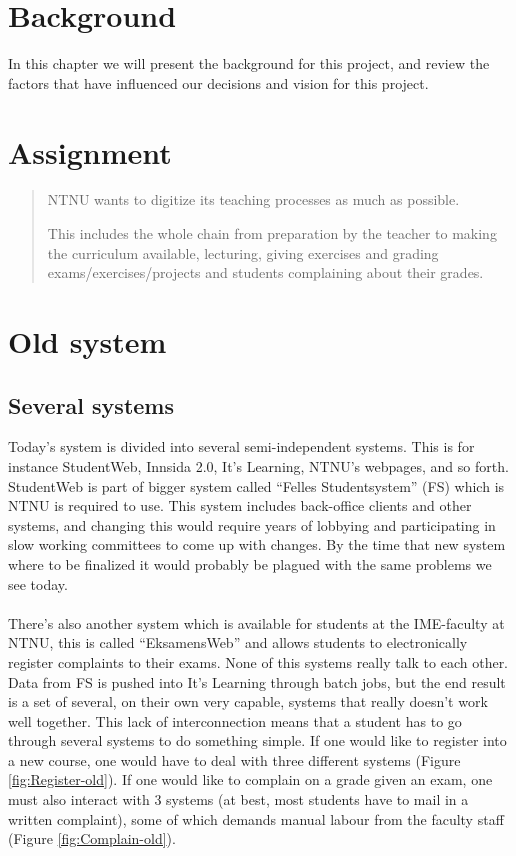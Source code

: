 \section{Background}
In this chapter we will present the background for this project, and review the factors that have
influenced our decisions and vision for this project.

\section{Assignment}

\begin{quote}
   NTNU wants to digitize its teaching processes as much as possible.\newline

   This includes the whole chain from preparation by the teacher to making the curriculum available, lecturing, giving exercises and grading exams/exercises/projects and students complaining about their grades.
\end{quote}

\section{Old system}
\subsection{Several systems}
Today's system is divided into several semi-independent systems. This is for instance StudentWeb, Innsida 2.0, It's Learning, NTNU's webpages, and so forth. 
StudentWeb is part of bigger system called ``Felles Studentsystem'' (FS) which is NTNU is required to use. This system includes back-office clients and other systems, and changing this
would require years of lobbying and participating in slow working committees to come up with changes. By the time that new system where to be finalized it would probably be plagued with the same problems we see today.
~\\\\
 There's also another system which is available for students at the IME-faculty at NTNU, this is called ``EksamensWeb'' and allows students to electronically register complaints to 
 their exams. None of this systems really talk to each other. Data from FS is pushed into It's Learning through batch jobs, but the end result is a set of several, on their own very capable, systems that really doesn't work well together.  
 This lack of interconnection means that a student has to go through several systems to do something simple. If one would like to register into a new course, one would have to deal with three different systems (Figure \ref{fig:Register-old}). If one would like to complain on a grade given an exam, one must also interact with 3 systems (at best, most students have to mail in a written complaint), some of which demands manual labour from the faculty staff (Figure \ref{fig:Complain-old}).

